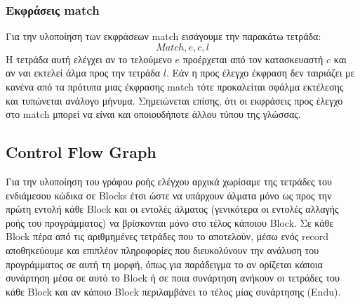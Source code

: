 \documentclass[12pt]{article}
\begin{document}
  
\subsubsection{Εκφράσεις match}
Για την υλοποίηση των εκφράσεων match εισάγουμε την παρακάτω τετράδα:
$$ Match, e, c, l$$
Η τετράδα αυτή ελέγχει αν το τελούμενο $e$ προέρχεται από τον κατασκευαστή $c$ και αν ναι εκτελεί άλμα προς την τετράδα $l$.  Εάν η προς έλεγχο έκφραση δεν ταιριάζει με κανένα από τα πρότυπα μιας έκφρασης match τότε προκαλείται σφάλμα εκτέλεσης και τυπώνεται ανάλογο μήνυμα. Σημειώνεται επίσης, ότι οι εκφράσεις προς έλεγχο στο match μπορεί να είναι και οποιουδήποτε άλλου τύπου της γλώσσας. 

\subsection{Control Flow Graph}
Για την υλοποίηση του γράφου ροής ελέγχου αρχικά χωρίσαμε της τετράδες του ενδιάμεσου κώδικα σε Blocks έτσι ώστε να υπάρχουν άλματα μόνο ως προς την πρώτη εντολή κάθε Block και οι εντολές άλματος
(γενικότερα οι εντολές αλλαγής ροής του προγράμματος) να βρίσκονται μόνο στο τέλος κάποιου Block. Σε κάθε Block πέρα από τις αριθμημένες τετράδες που το αποτελούν, μέσω ενός record αποθηκεύουμε και επιπλέον πληροφορίες που διευκολύνουν την ανάλυση του προγράμματος σε αυτή τη μορφή, όπως για παράδειγμα το αν ορίζεται κάποια συνάρτηση μέσα σε αυτό το Block ή σε ποια συνάρτηση ανήκουν οι τετράδες του κάθε Block και αν κάποιο Block περιλαμβάνει το τέλος μίας συνάρτησης (Endu).
\end{document}
